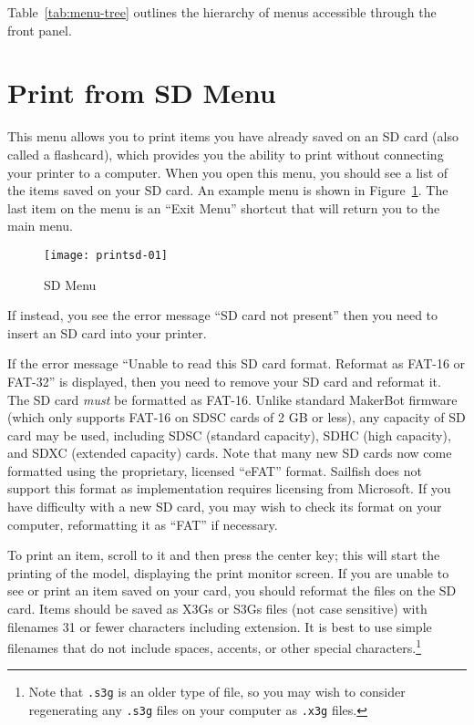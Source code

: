 \ifpdf
Table~\ref{tab:menu-tree} outlines the hierarchy of menus accessible through the front panel.
\fi




\section{Print from SD Menu}\label{sec:sdmenu}

This menu allows you to print items you have already saved on an \gls{SD card} (also called a flashcard), which provides you the ability to print without connecting your printer to a computer.  When you open this menu, you should see a list of the items saved on your SD card.  An example menu is shown in Figure~\ref{fig:sdmenu}.  The last item on the menu is an ``Exit Menu'' shortcut that will return you to the main menu.

\begin{figure}[!htbp]
  \centering
    \texttt{[image: printsd-01]}
    \caption{SD Menu}
  \label{fig:sdmenu}
\end{figure}

\ifpdf
\pagebreak[4]
\fi

If instead, you see the error message ``SD card not present'' then you need to insert an SD card into your printer.

If the error message ``Unable to read this SD card format.  Reformat as FAT-16 or FAT-32'' is displayed, then you need to remove your SD card and reformat it.  The SD card \emph{must} be formatted as \gls{FAT-16}.  Unlike standard MakerBot firmware (which only supports FAT-16 on SDSC cards of 2 GB or less), any capacity of SD card may be used, including SDSC (standard capacity), SDHC (high capacity), and SDXC (extended capacity) cards.  Note that many new SD cards now come formatted using the proprietary, licensed ``eFAT'' format.  Sailfish does not support this format as implementation requires licensing from Microsoft.  If you have difficulty with a new SD card, you may wish to check its format on your computer, reformatting it as ``FAT'' if necessary.

To print an item, scroll to it and then press the center key; this will start the printing of the model, displaying the print monitor screen. %
If you are unable to see or print an item saved on your card, you should reformat the files on the SD card.  Items should be saved as \glspl{X3G} or \glspl{S3G} files (not case sensitive) with filenames 31 or fewer characters including extension. It is best to use simple filenames that do not include spaces, accents, or other special characters.\footnote{Note that \texttt{.s3g} is an older type of file, so you may wish to consider regenerating any \texttt{.s3g} files on your computer as \texttt{.x3g} files.}

